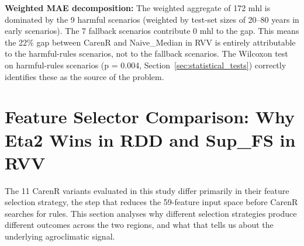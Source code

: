 \textbf{Weighted MAE decomposition: }The weighted aggregate of 172 mhl is dominated by the 9 harmful scenarios (weighted by test-set sizes of 20--80 years in early scenarios). The 7 fallback scenarios contribute 0 mhl to the gap. This means the 22\% gap between CarenR and Naive\_Median in RVV is entirely attributable to the harmful-rules scenarios, not to the fallback scenarios. The Wilcoxon test on harmful-rules scenarios (p = 0.004, Section~\ref{sec:statistical_tests}) correctly identifies these as the source of the problem.




\section{Feature Selector Comparison: Why Eta2 Wins in RDD and Sup\_FS in RVV}\label{sec:feature_selector_comparison_why}

The 11 CarenR variants evaluated in this study differ primarily in their feature selection strategy, the step that reduces the 59-feature input space before CarenR searches for rules. This section analyses why different selection strategies produce different outcomes across the two regions, and what that tells us about the underlying agroclimatic signal.

